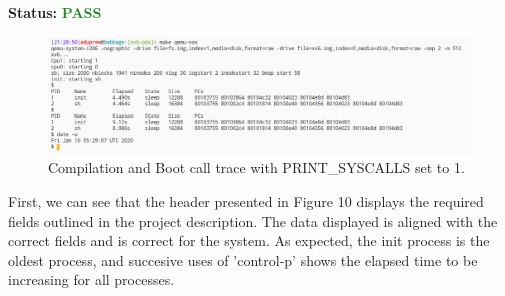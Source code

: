 \documentclass[11pt,letterpaper]{report}
\begin{document}
{  \noindent\textbf{Status:} \textcolor{ForestGreen}{\textbf{PASS}} \hfill \break
  
  \begin{figure}[h!]
	\centering
	\includegraphics[width=\linewidth]{test5.png}
	\caption[PRINT\_SYSCALLS=0]{Compilation and Boot call trace with PRINT\_SYSCALLS set to 1.}
	\label{fig:P1compileP0-1}
  \end{figure}

  First, we can see that the header presented in Figure 10 displays the required fields
  outlined in the project description. The data displayed is aligned with the correct fields
  and is correct for the system. As expected, the init process is the oldest process, 
  and succesive uses of 'control-p' shows the elapsed time to be increasing for all processes. 


  \pagebreak

\ifdefined \LF
} %
\fi
\end{document}
